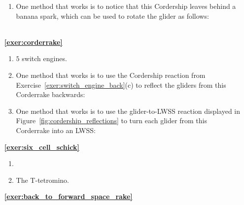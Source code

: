 \begin{multicols}{2}
\begin{itemize}[leftmargin=0em]
\begin{enumerate}[leftmargin=1.5em,label=\bf\color{ocre}(\alph*)]
			\item One method that works is to notice that this Cordership leaves behind a banana spark, which can be used to rotate the glider as follows: \\[-0.6em]
			
			 \\
		\end{enumerate}
		
		
		\item[\bf\color{ocre}\sffamily\ref{exer:corderrake}]
		\begin{enumerate}[leftmargin=1.5em,label=\bf\color{ocre}(\alph*)]
			\item $5$ switch engines.
			
			\item One method that works is to use the Cordership reaction from Exercise~\ref{exer:switch_engine_back}(c) to reflect the gliders from this Corderrake backwards: \\[-0.6em]
			
			
			\item One method that works is to use the glider-to-LWSS reaction displayed in Figure~\ref{fig:cordership_reflections} to turn each glider from this Corderrake into an LWSS: \\[-0.6em]
			
		\end{enumerate}
		
		
		\item[\bf\color{ocre}\sffamily\ref{exer:six_cell_schick}]
		\begin{enumerate}[leftmargin=1.5em,label=\bf\color{ocre}(\alph*)]
			\item {} \\
			
			\item The T-tetromino. \\
		\end{enumerate}
		
		
		\item[\bf\color{ocre}\sffamily\ref{exer:back_to_forward_space_rake}]  \\
		

\end{itemize}
\end{multicols}
